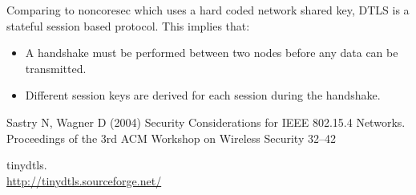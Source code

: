 Comparing to noncoresec which uses a hard coded network shared key, DTLS is a stateful session based protocol. This implies that:
\begin{itemize}
\item A handshake must be performed between two nodes before any data can be transmitted.
\item Different session keys are derived for each session during the handshake.
\end{itemize}



\begin{thebibliography}{99.}
 Sastry N, Wagner D (2004) Security Considerations for IEEE 802.15.4 Networks. Proceedings of the 3rd ACM Workshop on Wireless Security 32--42

 tinydtls. \\ 
\url{http://tinydtls.sourceforge.net/}
\end{thebibliography}